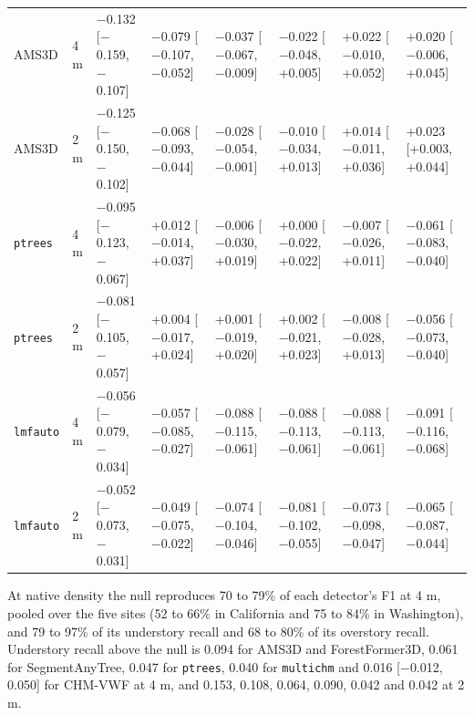 \documentclass[10pt]{article}
\begin{document}
{\begin{xltabular}{\textwidth}{llLLLLLL}
AMS3D & 4 m & $-$0.132 [$-$0.159, $-$0.107] & $-$0.079 [$-$0.107, $-$0.052] & $-$0.037 [$-$0.067, $-$0.009] & $-$0.022 [$-$0.048, +0.005] & +0.022 [$-$0.010, +0.052] & +0.020 [$-$0.006, +0.045] \\
AMS3D & 2 m & $-$0.125 [$-$0.150, $-$0.102] & $-$0.068 [$-$0.093, $-$0.044] & $-$0.028 [$-$0.054, $-$0.001] & $-$0.010 [$-$0.034, +0.013] & +0.014 [$-$0.011, +0.036] & +0.023 [+0.003, +0.044] \\
\texttt{ptrees} & 4 m & $-$0.095 [$-$0.123, $-$0.067] & +0.012 [$-$0.014, +0.037] & $-$0.006 [$-$0.030, +0.019] & +0.000 [$-$0.022, +0.022] & $-$0.007 [$-$0.026, +0.011] & $-$0.061 [$-$0.083, $-$0.040] \\
\texttt{ptrees} & 2 m & $-$0.081 [$-$0.105, $-$0.057] & +0.004 [$-$0.017, +0.024] & +0.001 [$-$0.019, +0.020] & +0.002 [$-$0.021, +0.023] & $-$0.008 [$-$0.028, +0.013] & $-$0.056 [$-$0.073, $-$0.040] \\
\texttt{lmfauto} & 4 m & $-$0.056 [$-$0.079, $-$0.034] & $-$0.057 [$-$0.085, $-$0.027] & $-$0.088 [$-$0.115, $-$0.061] & $-$0.088 [$-$0.113, $-$0.061] & $-$0.088 [$-$0.113, $-$0.061] & $-$0.091 [$-$0.116, $-$0.068] \\
\texttt{lmfauto} & 2 m & $-$0.052 [$-$0.073, $-$0.031] & $-$0.049 [$-$0.075, $-$0.022] & $-$0.074 [$-$0.104, $-$0.046] & $-$0.081 [$-$0.102, $-$0.055] & $-$0.073 [$-$0.098, $-$0.047] & $-$0.065 [$-$0.087, $-$0.044] \\
\end{xltabular}
}

At native density the null reproduces 70 to 79\% of each detector's F1 at 4 m,
pooled over the five sites (52 to 66\% in California and 75 to 84\% in
Washington), and 79 to 97\% of its understory recall and 68 to 80\% of its
overstory recall. Understory recall above the null is 0.094 for AMS3D and
ForestFormer3D, 0.061 for SegmentAnyTree, 0.047 for \texttt{ptrees}, 0.040 for
\texttt{multichm} and 0.016 [$-$0.012, 0.050] for CHM-VWF at 4 m, and 0.153, 0.108,
0.064, 0.090, 0.042 and 0.042 at 2 m.
\end{document}
